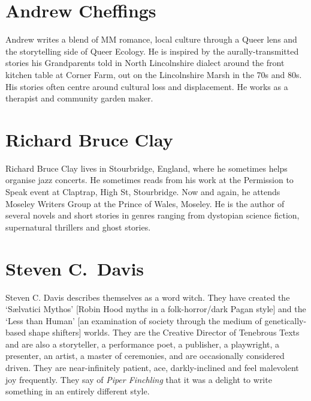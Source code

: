 \section*{Andrew Cheffings}%


Andrew writes a blend of MM romance, local culture through a Queer
lens and the storytelling side of Queer Ecology. He is inspired by the
aurally-transmitted stories his Grandparents told in North
Lincolnshire dialect around the front kitchen table at Corner Farm,
out on the Lincolnshire Marsh in the 70s and 80s. His stories often
centre around cultural loss and displacement. He works as a therapist
and community garden maker.

\section*{Richard Bruce Clay}%

Richard Bruce Clay lives in Stourbridge, England, where he
sometimes helps organise jazz concerts. He sometimes reads from his
work at the Permission to Speak event at Claptrap, High St,
Stourbridge. Now and again, he attends Moseley Writers Group at the
Prince of Wales, Moseley. He is the author of several novels and short
stories in genres ranging from dystopian science fiction, supernatural
thrillers and ghost stories.

\section*{Steven C.~Davis}%


Steven C. Davis describes themselves as a word witch. They have
created the `Sælvatici Mythos' [Robin Hood myths in a folk-horror/dark
  Pagan style] and the `Less than Human’ [an examination of society
  through the medium of genetically-based shape shifters] worlds. They
are the Creative Director of Tenebrous Texts and are also a
storyteller, a performance poet, a publisher, a playwright, a
presenter, an artist, a master of ceremonies, and are occasionally
considered driven. They are near-infinitely patient, ace,
darkly-inclined and feel malevolent joy frequently. They say of 
\textit{Piper Finchling} that it was a delight to write something in an entirely
different style.

